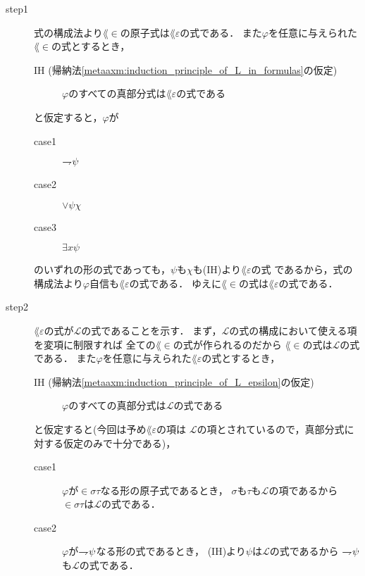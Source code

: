 	\begin{metaprf}\mbox{}
		\begin{description}
			\item[step1]
				式の構成法より$\lang{\in}$の原子式は$\lang{\varepsilon}$の式である．
				また$\varphi$を任意に与えられた$\lang{\in}$の式とするとき，
				\begin{description}
					\item[IH (帰納法\ref{metaaxm:induction_principle_of_L_in_formulas}の仮定)]
					$\varphi$のすべての真部分式は$\lang{\varepsilon}$の式である
				\end{description}
				と仮定すると，$\varphi$が
				\begin{description}
					\item[case1] $\rightharpoondown\hspace{-0.25em} \psi$
					\item[case2] $\vee \psi \chi$
					\item[case3] $\exists x \psi$
				\end{description}
				のいずれの形の式であっても，$\psi$も$\chi$も(IH)より$\lang{\varepsilon}$の式
				であるから，式の構成法より$\varphi$自信も$\lang{\varepsilon}$の式である．
				ゆえに$\lang{\in}$の式は$\lang{\varepsilon}$の式である．
				
			\item[step2]
				$\lang{\varepsilon}$の式が$\mathcal{L}$の式であることを示す．
				まず，$\mathcal{L}$の式の構成において使える項を変項に制限すれば
				全ての$\lang{\in}$の式が作られるのだから
				$\lang{\in}$の式は$\mathcal{L}$の式である．
				また$\varphi$を任意に与えられた$\lang{\varepsilon}$の式とするとき，
				\begin{description}
					\item[IH (帰納法\ref{metaaxm:induction_principle_of_L_epsilon}の仮定)]
					$\varphi$のすべての真部分式は$\mathcal{L}$の式である
				\end{description}
				と仮定すると(今回は予め$\lang{\varepsilon}$の項は
				$\mathcal{L}$の項とされているので，真部分式に対する仮定のみで十分である)，
				\begin{description}
					\item[case1] $\varphi$が$\in \sigma \tau$なる形の原子式であるとき，
						$\sigma$も$\tau$も$\mathcal{L}$の項であるから
						$\in \sigma \tau$は$\mathcal{L}$の式である．
						
					\item[case2] $\varphi$が$\rightharpoondown\hspace{-0.25em} \psi$なる形の式であるとき，
						(IH)より$\psi$は$\mathcal{L}$の式であるから
						$\rightharpoondown\hspace{-0.25em} \psi$も$\mathcal{L}$の式である．
						

\end{description}
\end{description}
\end{metaprf}

